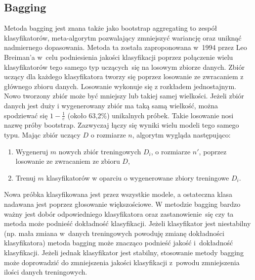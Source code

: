 \subsection{Bagging}
Metoda bagging  jest znana także jako bootstrap aggregating to zespół klasyfikatorów, meta-algorytm pozwalający zmniejszyć wariancję oraz uniknąć nadmiernego dopasowania. Metoda ta została zaproponowana w 1994 przez Leo Breiman’a w celu podniesienia jakości klasyfikacji poprzez połączenie wielu klasyfikatorów tego samego typ uczących się na losowym zbiorze danych. Zbiór uczący dla każdego klasyfikatora tworzy się poprzez losowanie ze zwracaniem z głównego zbioru danych. Losowanie wykonuje się z rozkładem jednostajnym. Nowo tworzony zbiór może być mniejszy lub takiej samej wielkości. Jeżeli zbiór danych jest duży i wygenerowany zbiór ma taką samą wielkość, można spodziewać się $1-\frac{1}{e}$ (około 63,2\%) unikalnych próbek. Takie losowanie nosi nazwę próby bootstrap. Zazwyczaj łączy się wyniki wielu modeli tego samego typu. Mając zbiór uczący $D$ o rozmiarze $n$, algorytm wygląda następująco:
\begin{enumerate}
	\item Wygeneruj $m$ nowych zbiór treningowych $D_i$, o rozmiarze $n'$, poprzez losowanie ze zwracaniem ze zbioru $D$,
	\item Trenuj $m$ klasyfikatorów w oparciu o wygenerowane zbiory treningowe $D_i$.	
\end{enumerate}
Nowa próbka klasyfikowana jest przez wszystkie modele, a ostateczna klasa nadawana jest poprzez głosowanie większościowe.
W metodzie bagging bardzo ważny jest dobór odpowiedniego klasyfikatora oraz zastanowienie się czy ta metoda może podnieść dokładność klasyfikacji. Jeżeli klasyfikator jest niestabilny (np. mała zmiana w danych treningowych powoduję zmianę dokładności klasyfikatora) metoda bagging może znacząco podnieść jakość i dokładność klasyfikacji. Jeżeli jednak klasyfikator jest stabilny, stosowanie metody bagging może doprowadzić do zmniejszenia jakości klasyfikacji z powodu zmniejszenia ilości danych treningowych.
